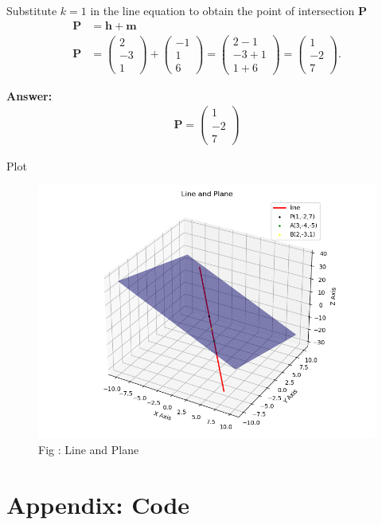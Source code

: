 \documentclass{beamer}
\numberwithin{equation}{section}
\theoremstyle{remark}
\newcommand{\myvec}[1]{\ensuremath{\begin{pmatrix}#1\end{pmatrix}}}
\let\vec\mathbf
\begin{document}
\begin{frame}

Substitute $k=1$ in the line equation to obtain the point of intersection $\vec{P}$
\begin{align}
\vec{P} &= \vec{h}  +\vec{m} \\
\vec{P} &= \myvec{2\\-3\\1} + \myvec{-1\\1\\6} = \myvec{2-1\\-3+1\\1+6} = \myvec{1\\-2\\7}.
\end{align}

\textbf{Answer:}
\begin{align}
\vec{P} = \myvec{1\\-2\\7}
\end{align}
  
\end{frame} 

\begin{frame}{Plot}

\begin{figure}[h!]
  \centering
  \includegraphics[width=0.8\columnwidth]{figs/intersection.png} 
   \caption*{Fig : Line and Plane}
  \label{Fig1}
\end{figure}

\end{frame}

\section*{Appendix: Code}
\end{document}
